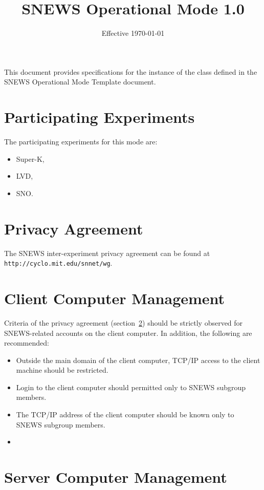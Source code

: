 \documentclass{article}
\begin{document}
\title{SNEWS Operational Mode 1.0}         
\date{Effective \today}
\maketitle

This document provides specifications for the instance of
the class defined in the SNEWS Operational Mode Template document.


\section{Participating Experiments}

The participating experiments for this mode are:

\begin{itemize}
\item Super-K,
\item LVD,
\item SNO.
\end{itemize}

\section{Privacy Agreement}\label{privacy}

The SNEWS inter-experiment privacy agreement can be found at 
{\tt http://cyclo.mit.edu/snnet/wg}.

\section{Client Computer Management}

Criteria of the privacy agreement (section~\ref{privacy}) should
be strictly observed for SNEWS-related accounts on the client computer.
In addition, the following are recommended:

\begin{itemize}
\item Outside the main domain of the 
client computer, TCP/IP access to the client machine should be restricted.
\item Login to the client computer should permitted only to SNEWS subgroup 
members.
\item The TCP/IP address of the client computer should be known only to 
SNEWS subgroup members.
\item 
\end{itemize}

\section{Server Computer Management}
\end{document}
